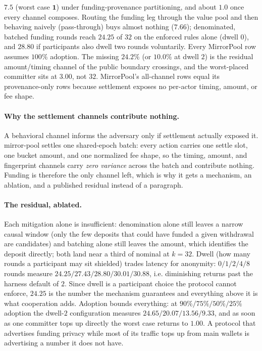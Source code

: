 \documentclass[10pt]{article}
\begin{document}
\begin{table}[h]
{$\mathbf{7.5}$ (worst case $\mathbf{1}$) under funding-provenance partitioning,
and about $\mathbf{1.0}$ once every channel composes. Routing the funding leg
through the value pool and then behaving naively (pass-through) buys almost
nothing ($7.66$); denominated, batched funding rounds reach
$\mathbf{24.25}$ of $32$ on the enforced rules alone (dwell $0$), and $28.80$ if
participants also dwell two rounds voluntarily. Every MirrorPool row assumes
$100\%$ adoption. The missing $\mathbf{24.2\%}$ (or $10.0\%$ at dwell $2$) is the
residual amount/timing channel of the public boundary crossings, and the
worst-placed committer sits at $3.00$, not $32$. MirrorPool's all-channel rows
equal its provenance-only rows because settlement exposes no per-actor timing,
amount, or fee shape.}
\end{table}

\paragraph{Why the settlement channels contribute nothing.} A behavioral channel
informs the adversary only if settlement actually exposed it. mirror-pool settles
one shared-epoch batch: every action carries one settle slot, one bucket amount,
and one normalized fee shape, so the timing, amount, and fingerprint channels
carry \emph{zero variance} across the batch and contribute nothing. Funding is
therefore the only channel left, which is why it gets a mechanism, an ablation,
and a published residual instead of a paragraph.

\paragraph{The residual, ablated.} Each mitigation alone is insufficient:
denomination alone still leaves a narrow causal window (only the few deposits that
could have funded a given withdrawal are candidates) and batching alone still
leaves the amount, which identifies the deposit directly; both land near a third
of nominal at $k=32$. Dwell (how many rounds a participant may sit shielded)
trades latency for anonymity: $0/1/2/4/8$ rounds measure
$24.25 / 27.43 / 28.80 / 30.01 / 30.88$, i.e. diminishing returns past the harness
default of $2$. Since dwell is a participant choice the protocol cannot enforce,
$24.25$ is the number the mechanism guarantees and everything above it is what
cooperation adds. Adoption bounds everything: at $90\%/75\%/50\%/25\%$ adoption the
dwell-$2$ configuration measures $24.65 / 20.07 / 13.56 / 9.33$, and as soon as one
committer tops up directly the worst case returns to $1.00$. A protocol that
advertises funding privacy while most of its traffic tops up from main wallets is
advertising a number it does not have.
\end{document}
